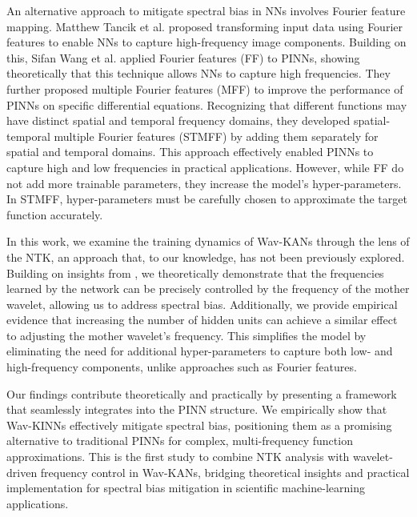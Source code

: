 An alternative approach to mitigate spectral bias in NNs involves Fourier feature mapping. Matthew Tancik et al. \cite{FourierFeaturesTancik2020} proposed transforming input data using Fourier features to enable NNs to capture high-frequency image components. Building on this, Sifan Wang et al. \cite{WANG2021113938fourierfeaturespINNs} applied Fourier features (FF) to PINNs, showing theoretically that this technique allows NNs to capture high frequencies. They further proposed multiple Fourier features (MFF) to improve the performance of PINNs on specific differential equations. Recognizing that different functions may have distinct spatial and temporal frequency domains, they developed spatial-temporal multiple Fourier features (STMFF) by adding them separately for spatial and temporal domains. This approach effectively enabled PINNs to capture high and low frequencies in practical applications. However, while FF do not add more trainable parameters, they increase the model's hyper-parameters. In STMFF, hyper-parameters must be carefully chosen to approximate the target function accurately.



In this work, we examine the training dynamics of Wav-KANs through the lens of the NTK, an approach that, to our knowledge, has not been previously explored. Building on insights from \cite{WANG2021113938fourierfeaturespINNs}, we theoretically demonstrate that the frequencies learned by the network can be precisely controlled by the frequency of the mother wavelet, allowing us to address spectral bias. Additionally, we provide empirical evidence that increasing the number of hidden units can achieve a similar effect to adjusting the mother wavelet’s frequency. This simplifies the model by eliminating the need for additional hyper-parameters to capture both low- and high-frequency components, unlike approaches such as Fourier features.

Our findings contribute theoretically and practically by presenting a framework that seamlessly integrates into the PINN structure. We empirically show that Wav-KINNs effectively mitigate spectral bias, positioning them as a promising alternative to traditional PINNs for complex, multi-frequency function approximations. This is the first study to combine NTK analysis with wavelet-driven frequency control in Wav-KANs, bridging theoretical insights and practical implementation for spectral bias mitigation in scientific machine-learning applications.